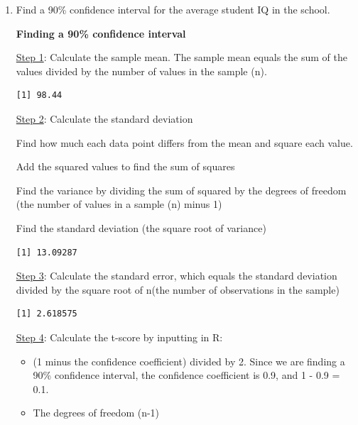 \documentclass[12pt,letterpaper]{article}
\begin{document}
\begin{enumerate}
	\item Find a 90\% confidence interval for the average student IQ in the school.\\

\newpage

\textbf{Finding a 90\% confidence interval}

\noindent \underline{Step 1}: Calculate the sample mean. The sample mean equals the sum of the values divided by the number of values in the sample (n).


\begin{verbatim}
[1] 98.44
\end{verbatim}

\noindent \underline{Step 2}: Calculate the standard deviation 

\noindent Find how much each data point differs from the mean and square each value. 



\noindent Add the squared values to find the sum of squares


\noindent Find the variance by dividing the sum of squared by the degrees of freedom (the number of values in a sample (n) minus 1)

  

\noindent Find the standard deviation (the square root of variance)



\begin{verbatim}
[1] 13.09287
\end{verbatim}

\noindent \underline{Step 3}: Calculate the standard error, which equals the standard deviation divided by the square root of n(the number of observations in the sample)

  

\begin{verbatim}
[1] 2.618575
\end{verbatim}

\newpage

\noindent \underline{Step 4}: Calculate the t-score by inputting in R: 
	\begin{itemize}
\item (1 minus the confidence coefficient) divided by 2. Since we are finding a 90\% confidence interval, the confidence coefficient is 0.9, and 1 - 0.9 = 0.1. 
\item The degrees of freedom (n-1)
    \end{itemize}
    

\end{enumerate}
\end{document}
